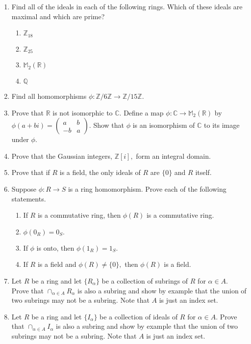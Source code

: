 \documentclass[12pt]{article}
\newcommand{\bbZ}{\mathbb{Z}}
\newcommand{\bbR}{\mathbb{R}}
\newcommand{\bbQ}{\mathbb{Q}}
\newcommand{\bbC}{\mathbb{C}}
\newcommand{\bbM}{\mathbb{M}}
\begin{document}
\begin{enumerate}
\item Find all of  the ideals in each of the following rings. Which of these ideals are maximal and which are prime?
	\begin{enumerate}
	\item $\bbZ_{18}$
	\item $\bbZ_{25}$
	\item $\mathbb{M}_2(\bbR)$
	\item $\bbQ$
	\end{enumerate}
\item Find all homomorphisms $\phi: \mathbb{Z}/6\mathbb{Z} \to  \mathbb{Z}/15\mathbb{Z}.$
\item Prove that $\bbR$ is not isomorphic to $\bbC.$
Define a map $\phi: \bbC \to \bbM_2(\bbR)$ by $\phi(a+bi)=\begin{pmatrix} a&b\\-b&a \end{pmatrix}$. Show that $\phi$ is an isomorphism of $\bbC$ to its image under $\phi.$
\item Prove that the Gaussian integers, $\bbZ[i],$ form an integral domain.
\item Prove that if $R$ is a field, the only ideals of $R$ are $\{0\}$ and $R$ itself.
\item Suppose $\phi: R \to S$ is a ring homomorphism. Prove each of the following statements.
	\begin{enumerate}
	\item If $R$ is a commutative ring, then $\phi(R)$ is a commutative ring.
	\item $\phi(0_R)=0_S.$
	\item If $\phi$ is onto, then $\phi(1_R)=1_S.$
	\item If $R$ is a field and $\phi(R)\not=\{0\},$ then $\phi(R)$ is a field.
	\end{enumerate}
\item Let $R$ be a ring and let $\{R_\alpha\}$ be a collection of subrings of $R$ for $\alpha \in A.$ Prove that $ \displaystyle\cap_{\alpha \in A} R_\alpha$ is also a subring and show by example that the union of two subrings may not be a subring. Note that $A$ is just an index set. 
\item Let $R$ be a ring and let $\{I_\alpha\}$ be a collection of ideals of $R$ for $\alpha \in A.$ Prove that $ \displaystyle\cap_{\alpha \in A} I_\alpha$ is also a subring and show by example that the union of two subrings may not be a subring. Note that $A$ is just an index set.
\end{enumerate}
\end{document}

